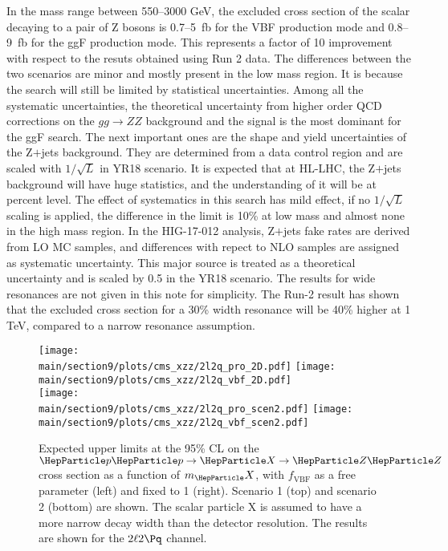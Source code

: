 In the mass range between 550--3000 GeV, the excluded cross section of the scalar decaying to a pair of Z bosons is 0.7--5~\unit{fb} for the VBF production mode and 0.8--9~\unit{fb} for the ggF production mode. This represents a factor of 10 improvement with respect to the resuts obtained using Run 2 data. The differences between the two scenarios are minor and mostly present in the low mass region. It is because the search will still be limited by statistical uncertainties. Among all the systematic uncertainties, the theoretical uncertainty from higher order QCD corrections on the $gg\to ZZ$ background and the signal is the most dominant for the ggF search. The next important ones are the shape and yield uncertainties of the Z$+$jets background. They are determined from a data control region and are scaled with $1/\sqrt{L}$ in YR18 scenario. It is expected that at HL-LHC, the Z$+$jets background will have huge statistics, and the understanding of it will be at percent level. The effect of systematics in this search has mild effect, if no $1/\sqrt{L}$ scaling is applied, the difference in the limit is 10\% at low mass and almost none in the high mass region. In the HIG-17-012 analysis, Z$+$jets fake rates are derived from LO MC samples, and differences with repect to NLO samples are assigned as systematic uncertainty. This major source is treated as a theoretical uncertainty and is scaled by 0.5 in the YR18 scenario. 
The results for wide resonances are not given in this note for simplicity. The Run-2 result has shown that the excluded cross section for a 30\% width resonance will be 40\% higher at 1 TeV, compared to a narrow resonance assumption. 

\begin{figure}[htbp]
        \centering
        \texttt{[image: \\main/section9/plots/cms\_xzz/2l2q\_pro\_2D.pdf]}
        \texttt{[image: \\main/section9/plots/cms\_xzz/2l2q\_vbf\_2D.pdf]}\\
        \texttt{[image: \\main/section9/plots/cms\_xzz/2l2q\_pro\_scen2.pdf]}
        \texttt{[image: \\main/section9/plots/cms\_xzz/2l2q\_vbf\_scen2.pdf]}
        \caption{
                Expected upper limits at the 95\% CL on the $\Pp\Pp\to\PX\to\PZ\PZ$ cross section as a function of $m_\PX$, with $f_{\mathrm{VBF}}$ as a free parameter (left) and fixed to 1 (right). Scenario 1 (top) and scenario 2 (bottom) are shown. The scalar particle X is assumed to have a more narrow decay width than the detector resolution. The results are shown for the $2\ell2\Pq$ channel. 
                        \label{fig:combinedresult}
                }
\end{figure}